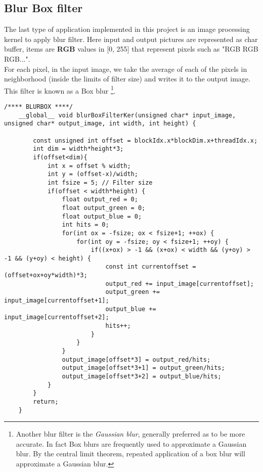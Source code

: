 \subsection{Blur Box filter}
	The last type of application implemented in this project is an image processing kernel to apply blur filter.
	Here input and output pictures are represented as char buffer, items are \textbf{RGB} values in [0, 255] that represent pixels such as "RGB RGB RGB...".\\
	For each pixel, in the input image, we take the average of each of the pixels in neighborhood (inside the limits of filter size) and writes it to the output image. This filter is known as a Box blur \footnote{Another blur filter is the \textit{Gaussian blur}, generally preferred as to be more accurate. In fact Box blurs are frequently used to approximate a Gaussian blur. By the central limit theorem, repeated application of a box blur will approximate a Gaussian blur.}.
	
	\begin{lstlisting}[caption={Implementation for Image processing Kernel (Blur Box Algorithm)}]
	/**** BLURBOX ****/
	__global__ void blurBoxFilterKer(unsigned char* input_image, unsigned char* output_image, int width, int height) {
	
		const unsigned int offset = blockIdx.x*blockDim.x+threadIdx.x;
		int dim = width*height*3;
		if(offset<dim){
			int x = offset % width;
			int y = (offset-x)/width;
			int fsize = 5; // Filter size
			if(offset < width*height) {
				float output_red = 0;
				float output_green = 0;
				float output_blue = 0;
				int hits = 0;
				for(int ox = -fsize; ox < fsize+1; ++ox) {
					for(int oy = -fsize; oy < fsize+1; ++oy) {
						if((x+ox) > -1 && (x+ox) < width && (y+oy) > -1 && (y+oy) < height) {
							const int currentoffset = (offset+ox+oy*width)*3;
							output_red += input_image[currentoffset]; 
							output_green += input_image[currentoffset+1];
							output_blue += input_image[currentoffset+2];
							hits++;
						}
					}
				}
				output_image[offset*3] = output_red/hits;
				output_image[offset*3+1] = output_green/hits;
				output_image[offset*3+2] = output_blue/hits;
			}
		}
		return;
	}
	\end{lstlisting}

